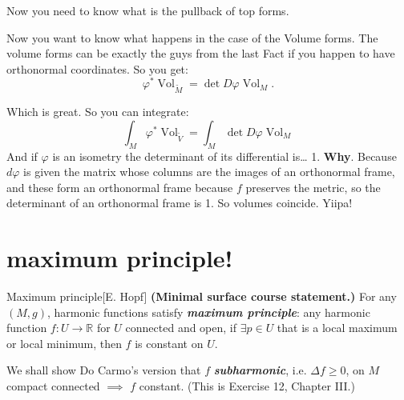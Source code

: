 Now you need to know what is the pullback of top forms. 

Now you want to know what happens in the case of the Volume forms. The volume forms can be exactly the guys from the last Fact if you happen to have orthonormal coordinates. So you get:
\[\varphi^*\operatorname{Vol}_{\widetilde{M}}=\det D\varphi \operatorname{Vol}_M.\]

Which is great. So you can integrate:
\[\int_M \varphi^*\operatorname{Vol}_{\widetilde{V}}=\int_M \det D\varphi \operatorname{Vol}_M\]
And if \(\varphi\) is an isometry the determinant of its differential is… 1. \textbf{Why}. Because \(d \varphi\) is given the matrix whose columns are the images of an orthonormal frame, and these form an orthonormal frame because \(f\) preserves the metric, so the determinant of an orthonormal frame is 1.  So volumes coincide. Yiipa!


\section{maximum principle!}

\begin{thing7}{Maximum principle}[E. Hopf]\leavevmode
\textbf{(Minimal surface course statement.)} For any \((M,g)\), harmonic functions satisfy \textit{\textbf{maximum principle}}: any harmonic function \(f:U \to \mathbb{R}\) for \(U\) connected and open, if \(\exists p \in U\) that is a local maximum or local minimum, then \(f\) is constant on \(U\).

We shall show Do Carmo's version that \(f\) \textit{\textbf{subharmonic}}, i.e. \(\Delta f\geq 0\), on \(M\) compact connected \(\implies\) \(f\) constant. (This is Exercise 12, Chapter III.)
\end{thing7}

